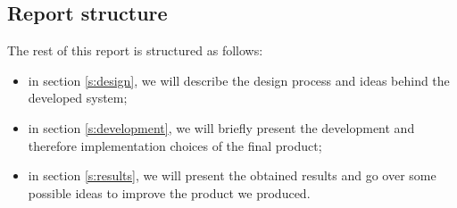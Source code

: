 \documentclass[../../main]{subfiles}
\begin{document}
\subsection{Report structure}
\label{ss:report-structure}

The rest of this report is structured as follows:
\begin{itemize}
    \item in section \ref{s:design}, we will describe the design process and ideas behind the developed system;
    \item in section \ref{s:development}, we will briefly present the development and therefore implementation choices of the final product;
    \item in section \ref{s:results}, we will present the obtained results and go over some possible ideas to improve the product we produced.
\end{itemize}
\end{document}
